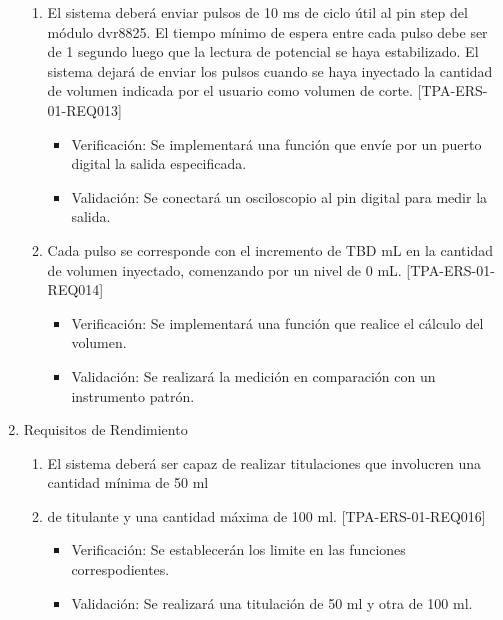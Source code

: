\documentclass[11pt]{charter}
\begin{document}
\begin{enumerate}
\begin{enumerate}
	\item El sistema deberá enviar pulsos de 10 ms de ciclo útil al pin step del módulo dvr8825. El tiempo mínimo de espera entre cada pulso debe ser de 1 segundo luego que la lectura de potencial se haya estabilizado. El sistema dejará de enviar los pulsos cuando se haya inyectado la cantidad de volumen indicada por el usuario como volumen de corte. [TPA-ERS-01-REQ013]
	\begin{itemize}
\item Verificación: Se implementará una función que envíe por un puerto digital la salida especificada.\\
\item Validación: Se conectará un osciloscopio al pin digital para medir la salida.\\
\end{itemize}

	\item Cada pulso se corresponde con el incremento de TBD mL en la cantidad de volumen inyectado, comenzando por un nivel de 0 mL. [TPA-ERS-01-REQ014]
		\begin{itemize}
\item Verificación: Se implementará una función que realice el cálculo del volumen.\\
\item Validación: Se realizará la medición en comparación con un instrumento patrón.\\
\end{itemize}


\end{enumerate}

\vspace{25px}

\item Requisitos de Rendimiento
	\begin{enumerate}
	\item El sistema deberá ser capaz de realizar titulaciones que involucren una cantidad mínima de 50 ml 	\item de titulante y una cantidad máxima de 100 ml. [TPA-ERS-01-REQ016]
	\begin{itemize}
\item Verificación: Se establecerán los limite en las funciones correspodientes.\\
\item Validación: Se realizará una titulación de 50 ml y otra de 100 ml.\\
\end{itemize}
	\end{enumerate}
	

\end{enumerate}
\end{document}
